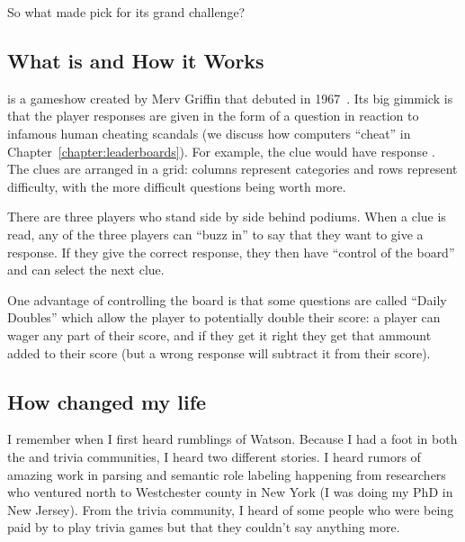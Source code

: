 So what made  pick \jeopardy{} for its grand challenge?


\subsection{What \jeopardy{} is and How it Works}

\jeopardy{} is a gameshow created by Merv Griffin that debuted in
1967~\citep{griffin-03}.
%
Its big gimmick is that the player responses are given in the form of
a question in reaction to infamous human cheating scandals (we discuss how
computers ``cheat'' in Chapter~\ref{chapter:leaderboards}).
%
For example, the clue
would have response .
%
%
The clues are arranged in a grid: columns represent categories and
rows represent difficulty, with the more difficult questions being
worth more.

There are three players who stand side by side behind podiums.
%
When a clue is read, any of the three players can ``buzz in'' to say
that they want to give a response.
%
If they give the correct response, they then have ``control of the
board'' and can select the next clue.

One advantage of controlling the board is that some questions are
called ``Daily Doubles'' which allow the player to potentially double
their score: a player can wager any part of their score, and if they
get it right they get that ammount added to their score (but a wrong
response will subtract it from their score).

\subsection{How \watson{} changed my life}

I remember when I first heard rumblings of Watson.
%
Because I had a foot in both the  and trivia communities, I
heard two different stories.
%
I heard rumors of amazing work in parsing and semantic role labeling
happening from researchers who ventured north to Westchester county in New
York (I was doing my PhD in New Jersey).
%
From the trivia community, I heard of some people who were being paid
by  to play trivia games but that they couldn't say anything
more.


